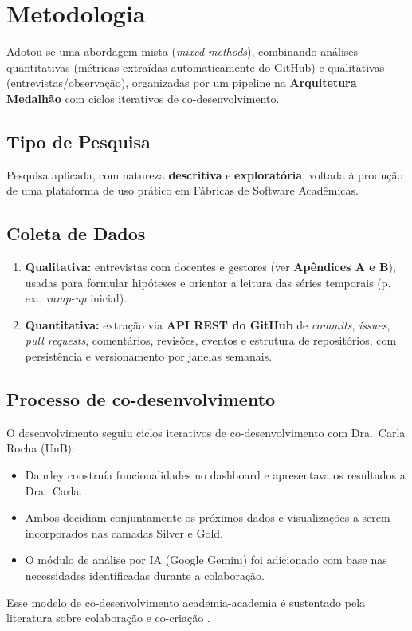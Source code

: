 \documentclass[
	12pt,
	openright,
	oneside,
	a4paper,
	brazil
]{abntex2}
\begin{document}
\section{Metodologia}

Adotou-se uma abordagem mista (\textit{mixed-methods}), combinando análises quantitativas (métricas extraídas automaticamente do GitHub) e qualitativas (entrevistas/observação), organizadas por um pipeline na \textbf{Arquitetura Medalhão} com ciclos iterativos de co-desenvolvimento.

\subsection{Tipo de Pesquisa}
Pesquisa aplicada, com natureza \textbf{descritiva} e \textbf{exploratória}, voltada à produção de uma plataforma de uso prático em Fábricas de Software Acadêmicas.

\subsection{Coleta de Dados}
\begin{enumerate}
    \item \textbf{Qualitativa:} entrevistas com docentes e gestores (ver \textbf{Apêndices A e B}), usadas para formular hipóteses e orientar a leitura das séries temporais (p.\,ex., \emph{ramp-up} inicial).
    \item \textbf{Quantitativa:} extração via \textbf{API REST do GitHub} de \emph{commits}, \emph{issues}, \emph{pull requests}, comentários, revisões, eventos e estrutura de repositórios, com persistência e versionamento por janelas semanais.
\end{enumerate}

\subsection{Processo de co-desenvolvimento}
O desenvolvimento seguiu ciclos iterativos de co-desenvolvimento com Dra.\ Carla Rocha (UnB):
\begin{itemize}
    \item Danrley construía funcionalidades no dashboard e apresentava os resultados a Dra.\ Carla.
    \item Ambos decidiam conjuntamente os próximos dados e visualizações a serem incorporados nas camadas Silver e Gold.
    \item O módulo de análise por IA (Google Gemini) foi adicionado com base nas necessidades identificadas durante a colaboração.
\end{itemize}
Esse modelo de co-desenvolvimento academia-academia é sustentado pela literatura sobre colaboração e co-criação \cite{bjerregaard2021lessons,jarvela2018collaboration,franssen2019cogs}.
\end{document}

